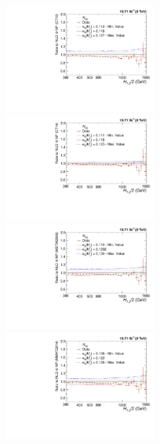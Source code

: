 \begin{figure}[!htbp]
 \begin{center}
 \hspace*{-5mm}\includegraphics[width=0.51\textwidth]{Plots_HT_2_150/Sensitivity_double_ratio_32_CT10.pdf}%
 \includegraphics[width=0.51\textwidth]{Plots_HT_2_150/Sensitivity_double_ratio_32_CT14.pdf}\\
 \vspace*{3mm}
 \hspace*{-5mm}\includegraphics[width=0.51\textwidth]{Plots_HT_2_150/Sensitivity_double_ratio_32_MSTW2008.pdf}%
 \includegraphics[width=0.51\textwidth]{Plots_HT_2_150/Sensitivity_double_ratio_32_MMHT2014.pdf}\\

\end{center}
\end{figure}
